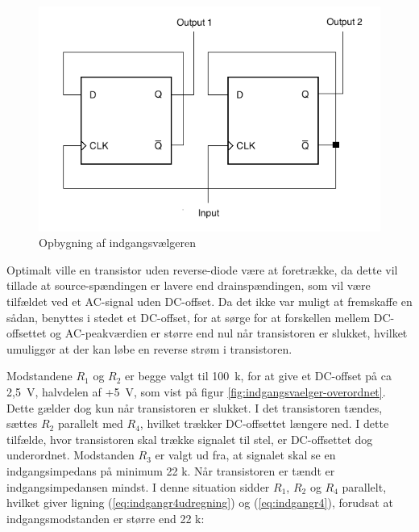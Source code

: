 \begin{figure}[h]
\centering
\includegraphics[scale=0.4]{teknisk/indgangsvaelger/flipflop.png}
\caption{Opbygning af indgangsvælgeren}
\label{fig:indgangsvaelger-flipflop}
\end{figure}

Optimalt ville en transistor uden reverse-diode være at foretrække, da dette vil tillade at source-spændingen er lavere end drainspændingen, som vil være tilfældet ved et AC-signal uden DC-offset. Da det ikke var muligt at fremskaffe en sådan, benyttes i stedet et DC-offset, for at sørge for at forskellen mellem DC-offsettet og AC-peakværdien er større end nul når transistoren er slukket, hvilket umuliggør at der kan løbe en reverse strøm i transistoren.

Modstandene $R_1$ og $R_2$ er begge valgt til 100~k\ohm, for at give et DC-offset på ca 2,5~V, halvdelen af +5~V, som vist på figur \ref{fig:indgangsvaelger-overordnet}. Dette gælder dog kun når transistoren er slukket. I det transistoren tændes, sættes $R_2$ parallelt med $R_4$, hvilket trækker DC-offsettet længere ned.
I dette tilfælde, hvor transistoren skal trække signalet til stel, er DC-offsettet dog underordnet. 
Modstanden $R_3$ er valgt ud fra, at signalet skal se en indgangsimpedans på minimum 22 k\ohm. Når transistoren er tændt er indgangsimpedansen mindst. I denne situation sidder $R_1$, $R_2$ og $R_4$ parallelt, hvilket giver ligning (\ref{eq:indgangr4udregning}) og (\ref{eq:indgangr4}), forudsat at indgangsmodstanden er større end 22 k\ohm:

